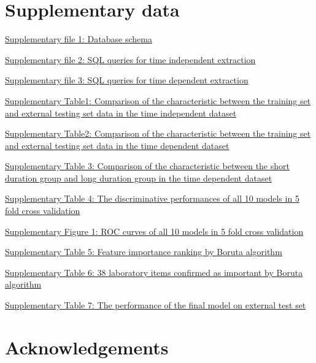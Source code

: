 \documentclass[final,3p,times,authoryear]{elsarticle}
\begin{document}
\appendix
\section{Supplementary data}\label{sec:supplementary}
\href{run:supplementary/DBschema.dbml}{Supplementary file 1: Database schema}
\label{file:DBschema}

\href{run:data.sql}{Supplementary file 2: SQL queries for time independent extraction}
\label{file:sql}

\href{run:data_time.sql}{Supplementary file 3: SQL queries for time dependent extraction}
\label{file:sql_time}

\href{run:supplementary/latex_data_description_table_train_test_origi.csv}{Supplementary Table1: Comparison of the characteristic between the training set and external testing set data in the time independent dataset}
\label{tab:train_test_origi}

\href{run:supplementary/latex_data_description_table_train_test_time.cdv}{Supplementary Table2: Comparison of the characteristic between the training set and external testing set data in the time dependent dataset}
\label{tab:train_test_time}

\href{run:supplementary/latex_data_description_table_outcome_time.csv}{Supplementary Table 3: Comparison of the characteristic between the short duration group and long duration group in the time dependent dataset}
\label{tab:good_outcome_poor_outcome_time}


\href{run:supplementary/kfolint_results.csv}{Supplementary Table 4: The discriminative performances of all 10 models in 5 fold cross validation}
\label{tab:kfold_results}

\href{run:supplementary/koldall.png}{Supplementary Figure 1: ROC curves of all 10 models in 5 fold cross validation}
\label{fig:kfold_all}

\href{run:supplementary/ranking_df.csv}{Supplementary Table 5: Feature importance ranking by Boruta algorithm}
\label{tab:boruta_ranking_df}

\href{run:supplementary/top38_confirmed_vars.csv}{Supplementary Table 6: 38 laboratory items confirmed as important by Boruta algorithm}
\label{tab:boruta_confirmed_vars}

\href{run:supplementary/extval_result.csv}{Supplementary Table 7: The performance of the final model on external test set}
\label{tab:extval_result}


\section{Acknowledgements}\label{Acknowledgements}


 


 
\end{document}
